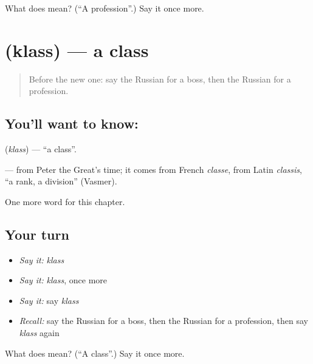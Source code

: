 \begin{tcolorbox}[breakable,colback=teal!4,colframe=teal!35!black,title={Before you move on}]
What does  mean? (\textquotedblleft{}A profession\textquotedblright{}.) Say it once more.
\end{tcolorbox}
\section[\texorpdfstring{\ru{класс} (klass)}{класс (klass)}]{ (klass) — a class}

\label{lesson:RU-C110-class}



\begin{quote}
Before the new one: say the Russian for a boss, then the Russian for a profession.
\end{quote}

\subsection*{You'll want to know: }
\textbf{} (\emph{klass}) — \textquotedblleft{}a class\textquotedblright{}.

\begin{cousinweb}
\textbf{} — from Peter the Great's time; it comes from French \emph{classe}, from Latin \emph{classis}, \textquotedblleft{}a rank, a division\textquotedblright{} (Vasmer).
\end{cousinweb}

\begin{grammarlens}[title={What you've built}]
One more word for this chapter.
\end{grammarlens}

\subsection*{Your turn}
\begin{itemize}
\raggedright
  \item \emph{Say it:} \emph{klass}
  \item \emph{Say it:} \emph{klass}, once more
  \item \emph{Say it:} say \emph{klass}
  \item \emph{Recall:} say the Russian for a boss, then the Russian for a profession, then say \emph{klass} again
\end{itemize}

\begin{tcolorbox}[breakable,colback=teal!4,colframe=teal!35!black,title={Before you move on}]
What does  mean? (\textquotedblleft{}A class\textquotedblright{}.) Say it once more.
\end{tcolorbox}
